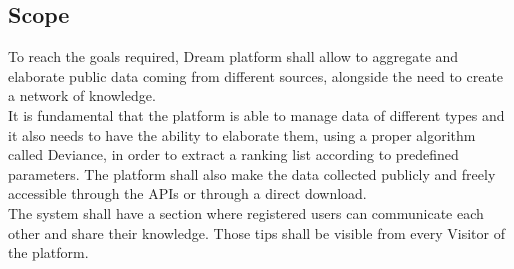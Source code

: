 \subsection{Scope}
To reach the goals required, Dream platform shall allow to aggregate and elaborate public data coming from different sources, alongside the need to create a network of knowledge.\\ It is fundamental that the platform is able to manage data of different types and it also needs to have the ability to elaborate them, using a proper algorithm called Deviance, in order to extract a ranking list according to predefined parameters. The platform shall also make the data collected publicly and freely accessible through the APIs or through a direct download.
\\The system shall have a section where registered users can communicate each other and share their knowledge. Those tips shall be visible from every Visitor of the platform. 

